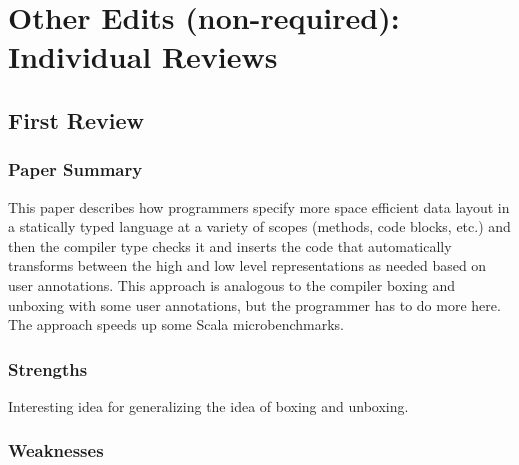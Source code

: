 \documentclass[9pt]{article}
\newenvironment{packed_item}{
\begin{itemize}
  \setlength{\itemsep}{1pt}
  \setlength{\parskip}{0.2pt}
  \setlength{\parsep}{0.2pt}
}{
  \end{itemize}
}
\begin{document}
\newpage

\section{Other Edits (non-required): Individual Reviews}

\subsection{First Review}

\subsubsection{Paper Summary}

This paper describes how programmers specify more space efficient data layout in a statically typed language at a variety of scopes (methods, code blocks, etc.) and then the compiler type checks it and inserts the code that automatically transforms between the high and low level representations as needed based on user annotations.  This approach is analogous to the compiler boxing and unboxing with some user annotations, but the programmer has to do more here. The approach speeds up some Scala microbenchmarks.

\vspace{5mm}

\subsubsection{Strengths}

\begin{packed_item}
\item Interesting idea for generalizing the idea of boxing and unboxing.
\end{packed_item}

\vspace{5mm}

\subsubsection{Weaknesses}
\end{document}
